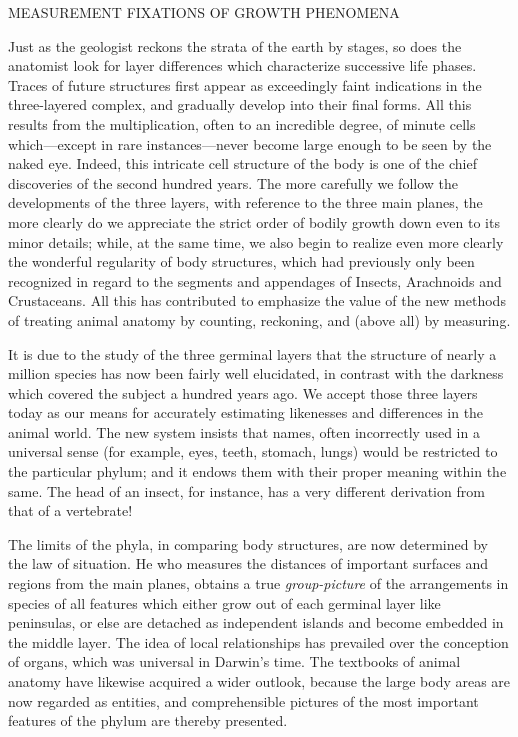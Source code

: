 MEASUREMENT FIXATIONS OF GROWTH PHENOMENA

Just as the geologist reckons the strata of the earth by stages, so does the anatomist look for
layer differences which characterize successive life phases. Traces of future structures first
appear as exceedingly faint indications in the three-layered complex, and gradually develop
into their final forms. All this results from the multiplication, often to an incredible degree, of
minute cells which—except in rare instances—never become large enough to be seen by the
naked eye. Indeed, this intricate cell structure of the body is one of the chief discoveries of
the second hundred years. The more carefully we follow the developments of the three
layers, with reference to the three main planes, the more clearly do we appreciate the strict
order of bodily growth down even to its minor details; while, at the same time, we also begin
to realize even more clearly the wonderful regularity of body structures, which had
previously only been recognized in regard to the segments and appendages of Insects,
Arachnoids and Crustaceans. All this has contributed to emphasize the value of the new
methods of treating animal anatomy by counting, reckoning, and (above all) by measuring.

It is due to the study of the three germinal layers that the structure of nearly a million species
has now been fairly well elucidated, in contrast with the darkness which covered the subject a
hundred years ago. We accept those three layers today as our means for accurately estimating
likenesses and differences in the animal world. The new system insists that names, often
incorrectly used in a universal sense (for example, eyes, teeth, stomach, lungs) would be
restricted to the particular phylum; and it endows them with their proper meaning within the
same. The head of an insect, for instance, has a very different derivation from that of a
vertebrate!

The limits of the phyla, in comparing body structures, are now determined by the law of
situation. He who measures the distances of important surfaces and regions from the main
planes, obtains a true \textit{group-picture} of the arrangements in species of all features which
either grow out of each germinal layer like peninsulas, or else are detached as independent
islands and become embedded in the middle layer. The idea of local relationships has
prevailed over the conception of organs, which was universal in Darwin's time. The
textbooks of animal anatomy have likewise acquired a wider outlook, because the large body
areas are now regarded as entities, and comprehensible pictures of the most important
features of the phylum are thereby presented.

